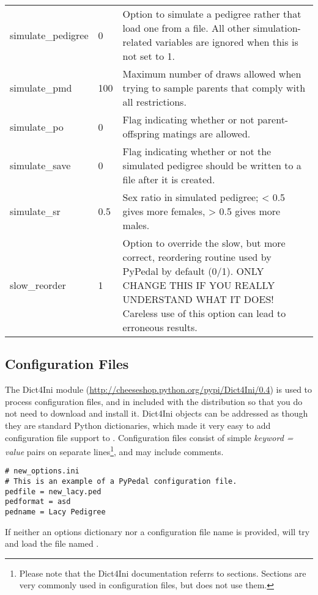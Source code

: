 \begin{center}
\begin{xtabular}{l|l|p{4in}}
	simulate\_pedigree & 0          & Option to simulate a pedigree rather that load one from a file. All other simulation-related variables are ignored when this is not set to 1. \\
	simulate\_pmd    & 100          & Maximum number of draws allowed when trying to sample parents that comply with all restrictions. \\
	simulate\_po     & 0            & Flag indicating whether or not parent-offspring matings are allowed. \\
	simulate\_save   & 0            & Flag indicating whether or not the simulated pedigree should be written to a file after it is created. \\
	simulate\_sr     & 0.5          & Sex ratio in simulated pedigree; < 0.5 gives more females, > 0.5 gives more males. \\
	slow\_reorder    & 1            & Option to override the slow, but more correct, reordering routine used by PyPedal by default (0/1).  ONLY CHANGE THIS IF YOU REALLY UNDERSTAND WHAT IT DOES!  Careless use of this option can lead to erroneous results. \\
    \end{xtabular}
\end{center}
\subsection{Configuration Files}
\label{sec:pypedal-options-file}
The Dict4Ini module (\url{http://cheeseshop.python.org/pypi/Dict4Ini/0.4}) is used to process configuration files, and in included with the distribution so that you do not need to download and install it.  Dict4Ini objects can be addressed as though they are standard Python dictionaries, which made it very easy to add configuration file support to \PyPedal{}.  Configuration files consist of simple \emph{keyword = value} pairs on separate lines\footnote{Please note that the Dict4Ini documentation referrs to sections.  Sections are very commonly used in configuration files, but \PyPedal{} does not use them.}, and may include comments.
\begin{verbatim}
# new_options.ini
# This is an example of a PyPedal configuration file.
pedfile = new_lacy.ped
pedformat = asd
pedname = Lacy Pedigree
\end{verbatim}
If neither an options dictionary nor a configuration file name is provided,  will try and load the file named .
